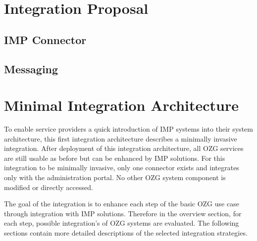 \documentclass[
     12pt,         %
     a4paper,      %
     BCOR=10mm,version=first,     %
     DIV=14,version=first,        %
     ]{scrreprt}
\begin{document}
\section{Integration Proposal}

\subsection{IMP Connector}

\subsection{Messaging}

\section{Minimal Integration Architecture}
To enable service providers a quick introduction of IMP systems into their system architecture, this first integration architecture describes a minimally invasive integration. After deployment of this integration architecture, all OZG services are still usable as before but can be enhanced by IMP solutions. For this integration to be minimally invasive, only one connector exists and integrates only with the administration portal. No other OZG system component is modified or directly accessed.

The goal of the integration is to enhance each step of the basic OZG use case through integration with IMP solutions. Therefore in the overview section, for each step, possible integration's of OZG systems are evaluated. The following sections contain more detailed descriptions of the selected integration strategies.
\end{document}
